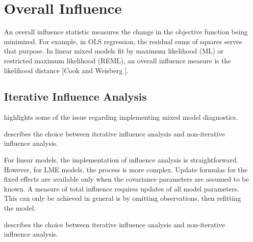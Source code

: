 \documentclass[12pt, a4paper]{report}
\theoremstyle{plain}
\theoremstyle{definition}
\theoremstyle{remark}
\begin{document}
\section{Overall Influence}
An overall influence statistic measures the change in the objective function being minimized. For example, in
OLS regression, the residual sums of squares serves that purpose. In linear mixed models fit by
 maximum likelihood (ML) or  restricted maximum likelihood (REML), an overall influence measure is the  likelihood distance [Cook and Weisberg ].


\subsection{Iterative Influence Analysis}

\citet{schabenberger} highlights some of the issue regarding implementing mixed model diagnostics.


\citet{schabenberger} describes the choice between  iterative influence analysis and  non-iterative influence analysis.



For linear models, the implementation of influence analysis is straightforward.
However, for LME models, the process is more complex. Update formulas for the fixed effects are available only when the covariance parameters are assumed to be known. A measure of total influence requires updates of all model parameters.
This can only be achieved in general is by omitting observations, then refitting the model.

\citet{schabenberger} describes the choice between  iterative influence analysis and  non-iterative influence analysis.


%
%
%
%
%
%
%









\end{document}
